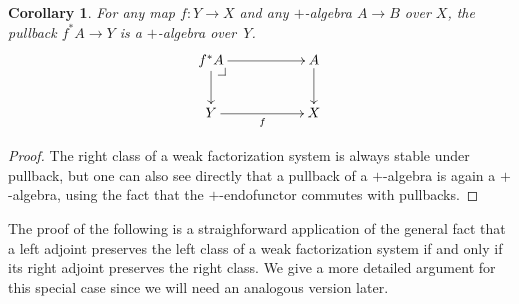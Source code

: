 \documentclass[12pt]{article}
\makeatletter
\newcommand{\pbcorner}[1][dr]{\save*!/#1-1.2pc/#1:(-1,1)@^{|-}\restore}
\newcommand{\ra}{\ensuremath{\rightarrow}}
\newtheorem{corollary}[theorem]{Corollary}
\theoremstyle{remark}
\theoremstyle{definition}
\makeatother
\begin{document}
\begin{corollary}\label{cor:plusalgpullback} 
For any map $f:Y\ra X$ and any $+$-algebra $A\ra B$ over $X$,  the pullback $f^*A \ra Y$ is a $+$-algebra over~$Y$.  
\begin{equation}\label{diagram:pluspushforward1}
\xymatrix{
f^*A \ar[d]  \ar[rr] \pbcorner & & A \ar[d]  \\
Y \ar[rr]_f && X
}
\end{equation}
\end{corollary}
\begin{proof}
The right class of a weak factorization system is always stable under pullback, but one can also see directly that a pullback of a $+$-algebra is again a $+$-algebra, using the fact that the $+$-endofunctor commutes with pullbacks.
\end{proof}


The proof of the following is a straighforward application of the general fact that a left adjoint preserves the left class of a weak factorization system if and only if its right adjoint preserves the right class.  We give a more detailed argument for this special case since we will need an analogous version later. 
\end{document}
